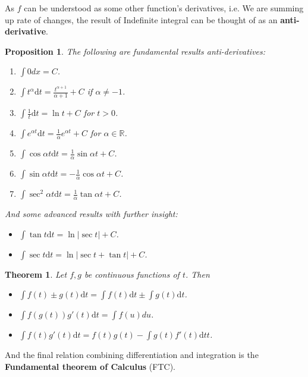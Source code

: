 \documentclass[12pt]{article}
\renewcommand{\d}[1]{\mathrm{d}{#1}}
\newtheorem*{theorem}{Theorem}
\newtheorem*{proposition}{Proposition}
\begin{document}
    As $f$ can be understood as some other function's derivatives, i.e. We are summing up rate of changes, the result of Indefinite integral can be thought of as an \textbf{anti-derivative}.

    \begin{proposition}
        The following are fundamental results anti-derivatives:\begin{enumerate}
            \item $\int 0 dx = C$.
            \item $\int t^{\alpha} \d{t} = \frac{t^{\alpha+1}}{\alpha+1} + C$ if $\alpha\neq -1$.
            \item $\int \frac{1}{t} \d{t} = \ln{t} + C$ for $t > 0$.
            \item $\int e^{\alpha t} \d{t} = \frac{1}{\alpha}e^{\alpha t} + C$ for $\alpha\in \mathbb{R}$.
            \item $\int \cos{\alpha t} \d{t} = \frac{1}{\alpha}\sin{\alpha t} + C$.
            \item $\int \sin{\alpha t} \d{t} = -\frac{1}{\alpha}\cos{\alpha t} + C$.
            \item $\int \sec^2{\alpha t} \d{t} = \frac{1}{\alpha}\tan{\alpha t} + C$.
        \end{enumerate}
        And some advanced results with further insight:\begin{itemize}
            \item $\int \tan{t} \d{t} = \ln|\sec{t}| + C$.
            \item $\int \sec{t} \d{t} = \ln|\sec{t} + \tan{t}| + C$.
        \end{itemize}
    \end{proposition}

    \begin{theorem}
        Let $f,g$ be continuous functions of $t$. Then \begin{itemize}
            \item $\int f(t)\pm g(t) \d{t} = \int f(t) \d{t} \pm \int g(t) \d{t}$.
            \item $\int f(g(t))g'(t) \d{t} = \int f(u) du$.
            \item $\int f(t)g'(t) \d{t} = f(t)g(t) - \int g(t)f'(t) \d{t}{t}$.
        \end{itemize}
    \end{theorem}

    And the final relation combining differentiation and integration is the \textbf{Fundamental theorem of Calculus} (FTC).
\end{document}
